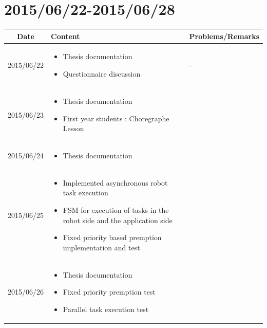 \documentclass[11pt]{article} %
\begin{document}
\newpage
\section{2015/06/22-2015/06/28}

\begin{center}
    \begin{longtable}{ | c | p{6cm} | p{5cm} |}
    \hline
    Date & Content & Problems/Remarks \\ 
    \endhead
    \hline    
     2015/06/22         & 
  	\begin{itemize}
  	\item Thesis documentation
  	\item Questionnaire discussion
	\end{itemize}  
   & - \\
\hline
  										 
 2015/06/23         & 
  \begin{itemize}
  \item Thesis documentation
  \item First year students : Choregraphe Lesson
\end{itemize}   
& 
 \\
\hline
  										 
  
  2015/06/24        & 
  \begin{itemize}
  \item Thesis documentation
  \end{itemize}   
  										 & 
 
  										 \\
  \hline
  
  2015/06/25         & 
  \begin{itemize}
  \item Implemented asynchronous robot task execution
  \item FSM for execution of tasks in the robot side and the application side
  \item Fixed priority based premption implementation and test
  \end{itemize}
  & 
\\  										 \hline

  2015/06/26         & 
  \begin{itemize}
  \item Thesis documentation
  \item Fixed priority premption test
  \item Parallel task execution test
\end{itemize}   
  & 
\\  										 \hline						


\end{longtable}
\end{center}
\end{document}
